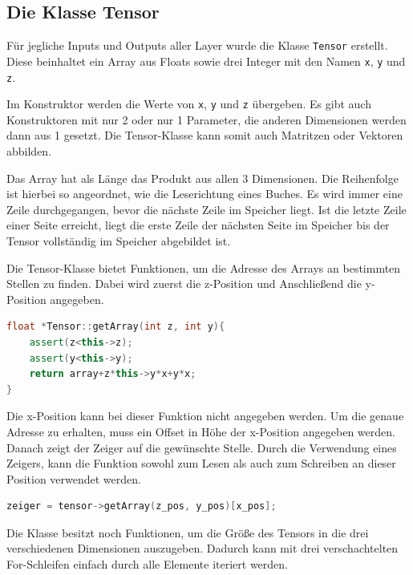 \documentclass[../main.tex]{subfiles}
\begin{document}
\subsection{Die Klasse Tensor}
Für jegliche Inputs und Outputs aller Layer wurde die Klasse \texttt{Tensor} erstellt. Diese beinhaltet ein Array aus Floats sowie drei Integer mit den Namen \texttt{x}, \texttt{y} und \texttt{z}. \par 
Im Konstruktor werden die Werte von \texttt{x}, \texttt{y} und \texttt{z} übergeben. Es gibt auch Konstruktoren mit nur 2 oder nur 1 Parameter, die anderen Dimensionen werden dann aus 1 gesetzt. Die Tensor-Klasse kann somit auch Matritzen oder Vektoren abbilden. \par 
Das Array hat als Länge das Produkt aus allen 3 Dimensionen. Die Reihenfolge ist hierbei so angeordnet, wie die Leserichtung eines Buches. Es wird immer eine Zeile durchgegangen, bevor die nächste Zeile im Speicher liegt. Ist die letzte Zeile einer Seite erreicht, liegt die erste Zeile der nächsten Seite im Speicher bis der Tensor vollständig im Speicher abgebildet ist. \par
Die Tensor-Klasse bietet Funktionen, um die Adresse des Arrays an bestimmten Stellen zu finden. Dabei wird zuerst die z-Position und Anschließend die y-Position angegeben.
\begin{lstlisting}[language=c++, caption=Funktion zum Erhalten eines Pointers auf den Tensor, captionpos=b, label=listing:tensor_get_array, frame=single, linewidth=\textwidth, breaklines=true]
float *Tensor::getArray(int z, int y){
	assert(z<this->z);
	assert(y<this->y);
	return array+z*this->y*x+y*x;
}
\end{lstlisting}
Die x-Position kann bei dieser Funktion nicht angegeben werden. Um die genaue Adresse zu erhalten, muss ein Offset in Höhe der x-Position angegeben werden. Danach zeigt der Zeiger auf die gewünschte Stelle. Durch die Verwendung eines Zeigers, kann die Funktion sowohl zum Lesen als auch zum Schreiben an dieser Position verwendet werden.
\begin{lstlisting}[language=c++, caption=Verwendung der getArray()-Funktion, captionpos=b, label=listing:verwendung_get_array, frame=single, linewidth=\textwidth, breaklines=true]
zeiger = tensor->getArray(z_pos, y_pos)[x_pos];
\end{lstlisting}
Die Klasse besitzt noch Funktionen, um die Größe des Tensors in die drei verschiedenen Dimensionen auszugeben. Dadurch kann mit drei verschachtelten For-Schleifen einfach durch alle Elemente iteriert werden.
\end{document}
